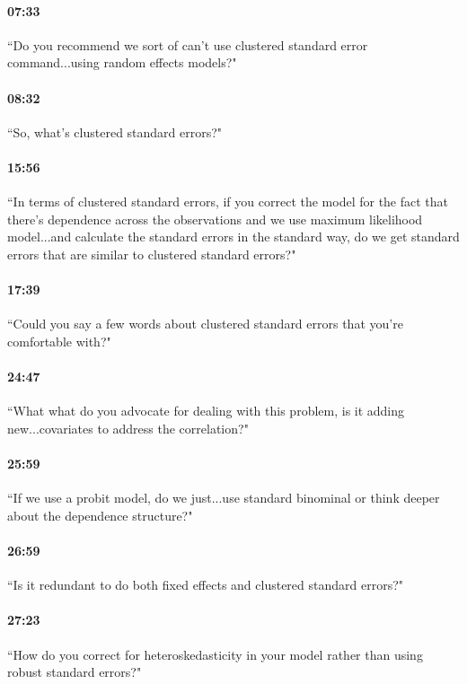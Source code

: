 \documentclass[11pt]{article}
\begin{document}
\paragraph{07:33} ``Do you recommend we sort of can't use clustered standard error command...using random effects models?"

\paragraph{08:32} ``So, what's clustered standard errors?"

\paragraph{15:56} ``In terms of clustered standard errors, if you correct the model for the fact that there's dependence across the observations and we use maximum likelihood model...and calculate the standard errors in the standard way, do we get standard errors that are similar to clustered standard errors?"

\paragraph{17:39} ``Could you say a few words about clustered standard errors that you're comfortable with?"

\paragraph{24:47} ``What what do you advocate for dealing with this problem, is it adding new...covariates to address the correlation?"

\paragraph{25:59} ``If we use a probit model, do we just...use standard binominal or think deeper about the dependence structure?"

\paragraph{26:59} ``Is it redundant to do both fixed effects and clustered standard errors?"

\paragraph{27:23} ``How do you correct for heteroskedasticity in your model rather than using robust standard errors?"
\end{document}

